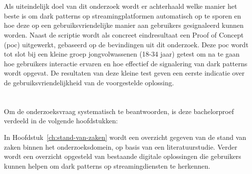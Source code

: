 \section{}%
\label{sec:onderzoeksdoelstelling}

\vspace{1em}

Als uiteindelijk doel van dit onderzoek wordt er achterhaald welke manier het beste is om dark patterns op streamingplatformen automatisch op te sporen en hoe deze op een gebruiksvriendelijke manier aan gebruikers gesignaleerd kunnen worden. Naast de scriptie wordt als concreet eindresultaat een Proof of Concept (\acrshort{poc}) uitgewerkt, gebaseerd op de bevindingen uit dit onderzoek. Deze \acrshort{poc} wordt tot slot bij een kleine groep jongvolwassenen (18-34 jaar) getest om na te gaan hoe gebruikers interactie ervaren en hoe effectief de signalering van dark patterns wordt opgevat. De resultaten van deze kleine test geven een eerste indicatie over de gebruiksvriendelijkheid van de voorgestelde oplossing.

\vspace{1em}

\section{}%
\label{sec:opzet-bachelorproef}

\vspace{1em}


Om de onderzoeksvraag systematisch te beantwoorden, is deze bachelorproef verdeeld in de volgende hoofdstukken:

\vspace{1em}

In Hoofdstuk~\ref{ch:stand-van-zaken} wordt een overzicht gegeven van de stand van zaken binnen het onderzoeksdomein, op basis van een literatuurstudie. Verder wordt een overzicht opgesteld van bestaande digitale oplossingen die gebruikers kunnen helpen om dark patterns op streamingdiensten te herkennen.

\vspace{1em}

